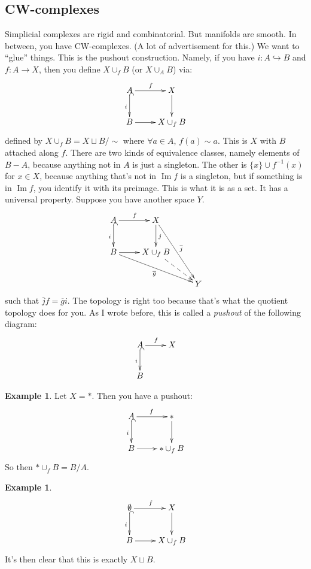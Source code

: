 \documentclass{amsart}
\theoremstyle{theorem}
\theoremstyle{definition}
\newtheorem{example}[theorem]{Example}
\DeclareMathOperator{\img}{Im}
\begin{document}
\subsection{CW-complexes}
Simplicial complexes are rigid and combinatorial. But manifolds are smooth. In between, you have CW-complexes. (A lot of advertisement for this.) We want to ``glue'' things. This is the pushout construction. Namely, if you have $i:A\hookrightarrow B$ and $f:A\to X$, then you define $X\cup_f B$ (or $X\cup_A B$) via:
\begin{equation*}
\xymatrix{A\ar[r]^f\ar@{^(->}[d]_i & X\ar[d]\\
B\ar[r] & X\cup_f B}
\end{equation*}
defined by $X\cup_f B=X\sqcup B/\sim$ where $\forall a\in A$, $f(a)\sim a$. This is $X$ with $B$ attached along $f$. There are two kinds of equivalence classes, namely elements of $B-A$, because anything not in $A$ is just a singleton. The other is $\{x\}\cup f^{-1}(x)$ for $x\in X$, because anything that's not in $\img f$ is a singleton, but if something is in $\img f$, you identify it with its preimage. This is what it is as a set. It has a universal property. Suppose you have another space $Y$.
\begin{equation*}
\xymatrix{A\ar[r]^f\ar@{^(->}[d]_i & X\ar[d]^j\ar[ddr]^{\overline{j}} & \\
B\ar[r]\ar[drr]_{\overline{g}} & X\cup_f B\ar@{-->}[dr] & \\
 & & Y}
\end{equation*}
such that $\overline{j}f=\overline{g}i$. The topology is right too because that's what the quotient topology does for you. As I wrote before, this is called a \emph{pushout} of the following diagram:
\begin{equation*}
\xymatrix{A\ar[r]^f\ar@{^(->}[d]_i & X\\
B &}
\end{equation*}
\begin{example}
Let $X=\ast$. Then you have a pushout:
\begin{equation*}
\xymatrix{A\ar[r]^f\ar@{^(->}[d]_i & \ast\ar[d]\\
B\ar[r] & \ast\cup_f B}
\end{equation*}
So then $\ast\cup_f B=B/A$.
\end{example}
\begin{example}
\begin{equation*}
\xymatrix{\emptyset\ar[r]^f\ar@{^(->}[d]_i & X\ar[d]\\
B\ar[r] & X\cup_f B}
\end{equation*}
It's then clear that this is exactly $X\sqcup B$.
\end{example}
\end{document}
